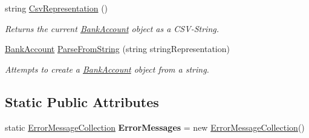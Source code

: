 \begin{DoxyCompactItemize}
string \hyperlink{class_application_logic_1_1_model_1_1_bank_account_a249d756a98fa9ff7bc821485993b8242}{CsvRepresentation} ()
\begin{DoxyCompactList}\small\item\em Returns the current \hyperlink{class_application_logic_1_1_model_1_1_bank_account}{BankAccount} object as a CSV-\/String. \item\end{DoxyCompactList}\item 
\hyperlink{class_application_logic_1_1_model_1_1_bank_account}{BankAccount} \hyperlink{class_application_logic_1_1_model_1_1_bank_account_a9d9e643c149d8a86af30f06bcd7b678f}{ParseFromString} (string stringRepresentation)
\begin{DoxyCompactList}\small\item\em Attempts to create a \hyperlink{class_application_logic_1_1_model_1_1_bank_account}{BankAccount} object from a string. \item\end{DoxyCompactList}\end{DoxyCompactItemize}
\subsection*{Static Public Attributes}
\begin{DoxyCompactItemize}
\item 
\hypertarget{class_application_logic_1_1_model_1_1_bank_account_a25c78720565b74997f595ed16d2643f2}{
static \hyperlink{class_application_logic_1_1_model_1_1_error_message_collection}{ErrorMessageCollection} {\bfseries ErrorMessages} = new \hyperlink{class_application_logic_1_1_model_1_1_error_message_collection}{ErrorMessageCollection}()}
\label{class_application_logic_1_1_model_1_1_bank_account_a25c78720565b74997f595ed16d2643f2}

\end{DoxyCompactItemize}
